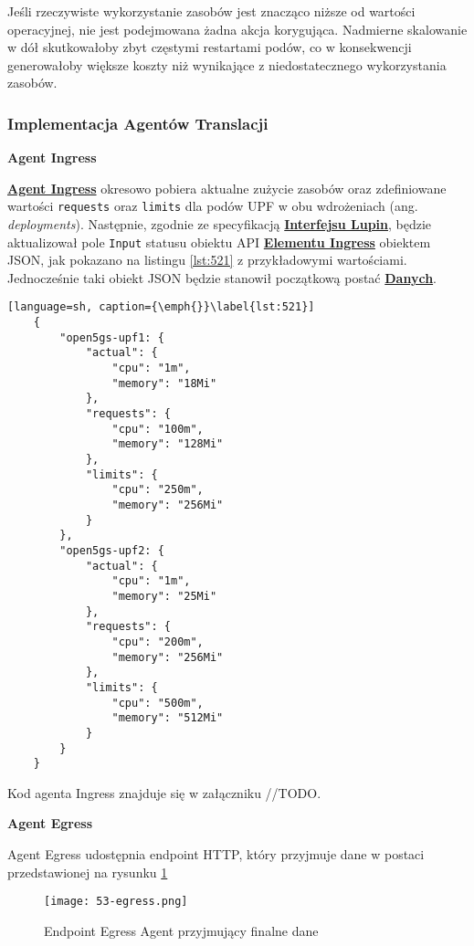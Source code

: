 Jeśli rzeczywiste wykorzystanie zasobów jest znacząco niższe od wartości operacyjnej, nie jest podejmowana żadna akcja korygująca. Nadmierne skalowanie w dół skutkowałoby zbyt częstymi restartami podów, co w konsekwencji generowałoby większe koszty niż wynikające z niedostatecznego wykorzystania zasobów.

\subsubsection{Implementacja Agentów Translacji}

\textbf{Agent Ingress}

\hyperlink{def:agent-ingress}{\textbf{Agent Ingress}} okresowo pobiera aktualne zużycie zasobów oraz zdefiniowane wartości \texttt{requests} oraz \texttt{limits} dla podów UPF w obu wdrożeniach (ang. \textit{deployments}). Następnie, zgodnie ze specyfikacją \hyperlink{def:interfejs-lupin}{\textbf{Interfejsu Lupin}}, będzie aktualizował pole \texttt{Input} statusu obiektu API \hyperlink{def:element-ingres}{\textbf{Elementu Ingress}} obiektem JSON, jak pokazano na listingu \ref{lst:521} z przykładowymi wartościami. Jednocześnie taki obiekt JSON będzie stanowił początkową postać \hyperlink{def:dane}{\textbf{Danych}}.

\begin{lstlisting}[language=sh, caption={\emph{}}\label{lst:521}]
    {
        "open5gs-upf1: {
            "actual": {
                "cpu": "1m",
                "memory": "18Mi"
            },
            "requests": {
                "cpu": "100m",
                "memory": "128Mi"
            },
            "limits": {
                "cpu": "250m",
                "memory": "256Mi"
            }
        },
        "open5gs-upf2: {
            "actual": {
                "cpu": "1m",
                "memory": "25Mi"
            },
            "requests": {
                "cpu": "200m",
                "memory": "256Mi"
            },
            "limits": {
                "cpu": "500m",
                "memory": "512Mi"
            }
        }
    }
\end{lstlisting}

Kod agenta Ingress znajduje się w załączniku //TODO.

\textbf{Agent Egress}

Agent Egress udostępnia endpoint HTTP, który przyjmuje dane w postaci przedstawionej na rysunku \ref{fig:53-egress}

\begin{figure}[!h]
    \centering \texttt{[image: 53-egress.png]}
    \caption{Endpoint Egress Agent przyjmujący finalne dane}\label{fig:53-egress}
\end{figure}

